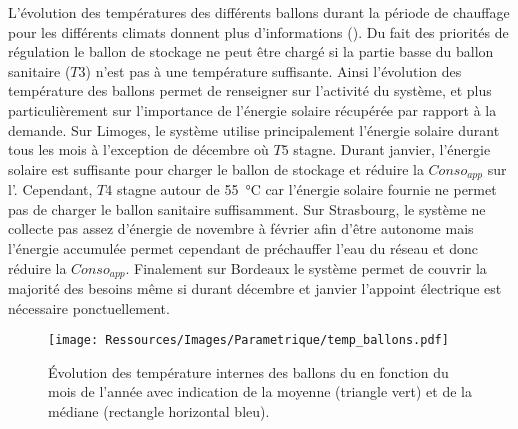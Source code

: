 L’évolution des températures des différents ballons durant la période de chauffage pour
les différents climats donnent plus d’informations (). Du
fait des priorités de régulation le ballon de stockage ne peut être chargé si la partie
basse du ballon sanitaire ($T3$) n’est pas à une température suffisante. Ainsi l’évolution
des température des ballons permet de renseigner sur l’activité du système, et plus
particulièrement sur l’importance de l’énergie solaire récupérée par rapport à la demande.
Sur Limoges, le système utilise principalement l’énergie solaire durant tous les
mois à l’exception de décembre où $T5$ stagne. Durant janvier, l’énergie solaire est
suffisante pour charger le ballon de stockage et réduire la $Conso_{app}$ sur
l’. Cependant, $T4$ stagne autour de \SI{55}{\celsius} car l’énergie solaire fournie
ne permet pas de charger le ballon sanitaire suffisamment. Sur Strasbourg, le système ne
collecte pas assez d’énergie de novembre à février afin d’être autonome mais l’énergie
accumulée permet cependant de préchauffer l’eau du réseau et donc réduire la
$Conso_{app}$. Finalement sur Bordeaux le système permet de couvrir la majorité des besoins
même si durant décembre et janvier l’appoint électrique est nécessaire ponctuellement.

\begin{figure}
    \centering
    \texttt{[image: Ressources/Images/Parametrique/temp\_ballons.pdf]}
    \caption[Évolution des température internes des ballons du ]
            {Évolution des température internes des ballons du  en fonction du mois
             de l’année avec indication de la moyenne (triangle vert) et
             de la médiane (rectangle horizontal bleu).}
    \label{fig:temp_ballon_mensuel}
\end{figure}


